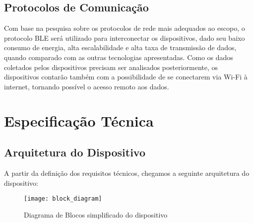 \documentclass[../monografia.tex]{subfiles}
\begin{document}
\subsection{Protocolos de Comunicação}


Com base na pesquisa sobre os protocolos de rede mais adequados ao escopo, o protocolo BLE será utilizado para interconectar os dispositivos, dado seu baixo consumo de energia, alta escalabilidade e alta taxa de transmissão de dados, quando comparado com as outras tecnologias apresentadas. Como os dados coletados pelos dispositivos precisam ser analisados posteriormente, os dispositivos contarão também com a possibilidade de se conectarem via Wi-Fi à internet, tornando possível o acesso remoto aos dados.


\section{Especificação Técnica}

\subsection{Arquitetura do Dispositivo} %
A partir da definição dos requisitos técnicos, chegamos a seguinte arquitetura do dispositivo:

\begin{figure}[h]
    \centering
    \texttt{[image: block\_diagram]}
    \caption{Diagrama de Blocos simplificado do dispositivo}
    \label{fig:Diagrama de Blocos}
\end{figure}
\end{document}
